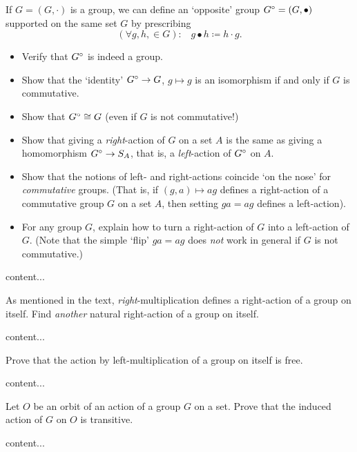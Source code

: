 \begin{exercise}
	If $G = (G,\cdot)$ is a group, we can define an `opposite' group $G \degree = (G,\bullet)$ supported on the same set $G$ by prescribing
	\[
		(\forall g,h,\in G): \;\;\; g\bullet h \coloneqq h \cdot g.
	\]
	\begin{itemize}
		\item Verify that $G\degree$ is indeed a group.
		\item Show that the `identity' $G\degree \to G$, $g\mapsto g$ is an isomorphism if and only if $G$ is commutative.
		\item Show that $G\degree \cong G$ (even if $G$ is not commutative!)
		\item Show that giving a \emph{right}-action of $G$ on a set $A$ is the same as giving a homomorphism $G\degree \to S_A$, that is, a \emph{left}-action of $G\degree$ on $A$. 
		\item Show that the notions of left- and right-actions coincide `on the nose' for \emph{commutative} groups. (That is, if $(g,a)\mapsto ag$ defines a right-action of a commutative group $G$ on a set $A$, then setting $ga=ag$ defines a left-action).
		\item For any group $G$, explain how to turn a right-action of $G$ into a left-action of $G$. (Note that the simple `flip' $ga=ag$ does \emph{not} work in general if $G$ is not commutative.)
	\end{itemize}
\end{exercise}
\begin{solution}
	content...
\end{solution}

\begin{exercise}
	As mentioned in the text, \emph{right}-multiplication defines a right-action of a group on itself. Find \emph{another} natural right-action of a group on itself.
\end{exercise}
\begin{solution}
	content...
\end{solution}

\begin{exercise}
	Prove that the action by left-multiplication of a group on itself is free.
\end{exercise}
\begin{solution}
	content...
\end{solution}

\begin{exercise}
	Let $O$ be an orbit of an action of a group $G$ on a set. Prove that the induced action of $G$ on $O$ is transitive.
\end{exercise}
\begin{solution}
	content...
\end{solution}

